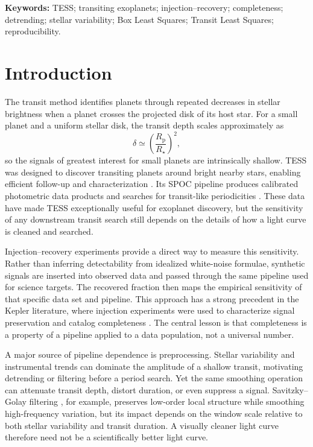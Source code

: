 \documentclass[11pt]{article}
\begin{document}
\noindent\textbf{Keywords:} TESS; transiting exoplanets; injection--recovery; completeness; detrending; stellar variability; Box Least Squares; Transit Least Squares; reproducibility.

\section{Introduction}
The transit method identifies planets through repeated decreases in stellar brightness when a planet crosses the projected disk of its host star. For a small planet and a uniform stellar disk, the transit depth scales approximately as
\begin{equation}
\delta \simeq \left(\frac{R_{\mathrm p}}{R_\star}\right)^2,
\end{equation}
so the signals of greatest interest for small planets are intrinsically shallow. TESS was designed to discover transiting planets around bright nearby stars, enabling efficient follow-up and characterization \cite{Ricker2015}. Its SPOC pipeline produces calibrated photometric data products and searches for transit-like periodicities \cite{Jenkins2016}. These data have made TESS exceptionally useful for exoplanet discovery, but the sensitivity of any downstream transit search still depends on the details of how a light curve is cleaned and searched.

Injection--recovery experiments provide a direct way to measure this sensitivity. Rather than inferring detectability from idealized white-noise formulae, synthetic signals are inserted into observed data and passed through the same pipeline used for science targets. The recovered fraction then maps the empirical sensitivity of that specific data set and pipeline. This approach has a strong precedent in the Kepler literature, where injection experiments were used to characterize signal preservation and catalog completeness \cite{Christiansen2013,Christiansen2016,Christiansen2020}. The central lesson is that completeness is a property of a pipeline applied to a data population, not a universal number.

A major source of pipeline dependence is preprocessing. Stellar variability and instrumental trends can dominate the amplitude of a shallow transit, motivating detrending or filtering before a period search. Yet the same smoothing operation can attenuate transit depth, distort duration, or even suppress a signal. Savitzky--Golay filtering \cite{SavitzkyGolay1964}, for example, preserves low-order local structure while smoothing high-frequency variation, but its impact depends on the window scale relative to both stellar variability and transit duration. A visually cleaner light curve therefore need not be a scientifically better light curve.
\end{document}
